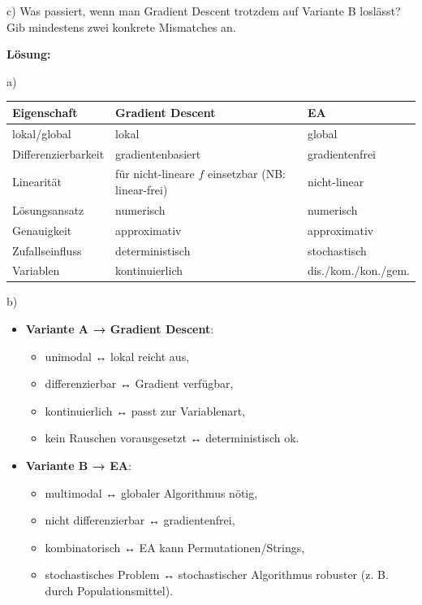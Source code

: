 \documentclass[11pt, a4paper]{article}
\begin{document}
c) Was passiert, wenn man Gradient Descent trotzdem auf Variante B loslässt? Gib mindestens zwei konkrete Mismatches an.


\textbf{Lösung:}


a)


{\small
\begin{tabularx}{\linewidth}{XXX}
\hline
\rowcolor{tableheadbg}
{\color{white}\textbf{Eigenschaft}} & {\color{white}\textbf{Gradient Descent}} & {\color{white}\textbf{EA}} \\[2pt]
\hline
\endhead
\hline
\endfoot
lokal/global & lokal & global \\
Differenzierbarkeit & gradientenbasiert & gradientenfrei \\
Linearität & für nicht-lineare $f$ einsetzbar (NB: linear-frei) & nicht-linear \\
Lösungsansatz & numerisch & numerisch \\
Genauigkeit & approximativ & approximativ \\
Zufallseinfluss & deterministisch & stochastisch \\
Variablen & kontinuierlich & dis./kom./kon./gem. \\
\end{tabularx}
}


b)

\begin{itemize}
  \item \textbf{Variante A → Gradient Descent}:
\begin{itemize}
  \item unimodal ↔ lokal reicht aus,
  \item differenzierbar ↔ Gradient verfügbar,
  \item kontinuierlich ↔ passt zur Variablenart,
  \item kein Rauschen vorausgesetzt ↔ deterministisch ok.
\end{itemize}
  \item \textbf{Variante B → EA}:
\begin{itemize}
  \item multimodal ↔ globaler Algorithmus nötig,
  \item nicht differenzierbar ↔ gradientenfrei,
  \item kombinatorisch ↔ EA kann Permutationen/Strings,
  \item stochastisches Problem ↔ stochastischer Algorithmus robuster (z. B. durch Populationsmittel).
\end{itemize}
\end{itemize}
\end{document}
